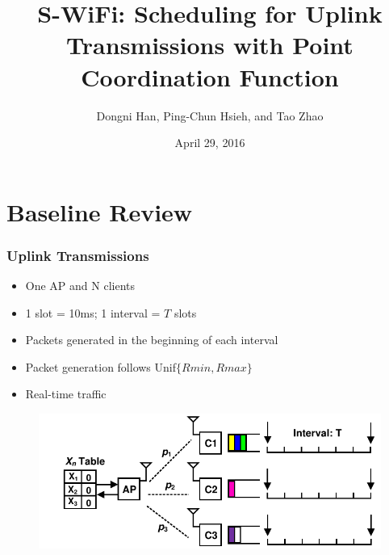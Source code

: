 \documentclass{beamer}
\begin{document}
\title{S-WiFi: Scheduling for Uplink Transmissions with Point Coordination Function}
\author{Dongni Han, Ping-Chun Hsieh, and Tao Zhao}
\date{April 29, 2016}
\newtheorem{thm}{Theorem} 
\begin{frame}
\titlepage
\end{frame}





\section{Baseline Review}

\begin{frame}
\frametitle{Uplink Transmissions}
\begin{itemize}
\item One AP and N clients
\item 1 slot = 10ms; 1 interval = $T$ slots
\item Packets generated in the beginning of each interval
\item Packet generation follows Unif$\{Rmin, Rmax\}$
\item Real-time traffic
\end{itemize}
\begin{figure}
\centering
\includegraphics[scale=0.8]{network.pdf}
\end{figure}
\end{frame}
\end{document}
